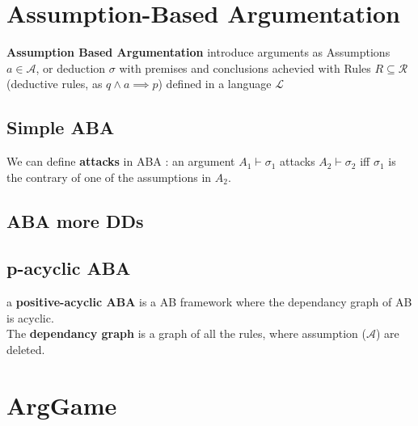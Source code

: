 \section{Assumption-Based Argumentation}
	
	\textbf{Assumption Based Argumentation} introduce arguments as Assumptions $a \in \mathcal{A}$, or deduction $\sigma$ with premises and conclusions achevied with Rules $R \subseteq \mathcal{R}$(deductive rules, as $q \wedge a \implies p$) defined in a language $\mathcal{L}$ 
	\subsection{Simple ABA}

		We can define \textbf{attacks} in ABA : an argument $A_1 \vdash \sigma_1$ attacks $A_2 \vdash \sigma_2$ iff $\sigma_1$ is the contrary of one of the assumptions in $A_2$.
	\subsection{ABA more DDs}
	\subsection{p-acyclic ABA}

		\begin{definition}
			a \textbf{positive-acyclic ABA} is a AB framework where the dependancy graph of AB is acyclic.\\
			The \textbf{dependancy graph} is a graph of all the rules, where assumption ($\mathcal{A}$) are deleted. 
		\end{definition}

\section{ArgGame}
